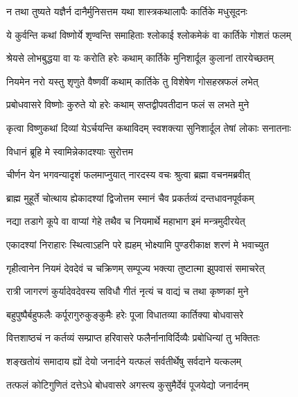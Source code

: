 \twolineshloka
{न तथा तुष्यते यज्ञैर्न दानैर्मुनिसत्तम}
{यथा शास्त्रकथालापैः कार्तिके मधुसूदनः} %

\twolineshloka
{ये कुर्वन्ति कथां विष्णोर्ये शृण्वन्ति समाहिताः}
{श्लोकाई श्लोकमेकं वा कार्तिके गोशतं फलम्} %

\twolineshloka
{श्रेयसे लोभबुद्धया वा यः करोति हरेः कथाम्}
{कार्तिके मुनिशार्दूल कुलानां तारयेच्छतम्} %

\twolineshloka
{नियमेन नरो यस्तु शृणुते वैष्णवीं कथाम्}
{कार्तिके तु विशेषेण गोसहस्रफलं लभेत्} %

\twolineshloka
{प्रबोधवासरे विष्णोः कुरुते यो हरेः कथाम्}
{सप्तद्वीपवतीदान फलं स लभते मुने} %

\twolineshloka
{कृत्वा विष्णुकथां दिव्यां येऽर्चयन्ति कथाविदम्}
{स्वशक्त्या सुनिशार्दूल तेषां लोकाः सनातनाः} %



\onelineshloka
{विधानं ब्रूहि मे स्वामिन्नेकादश्याः सुरोत्तम} %

\twolineshloka
{चीर्णन येन भगवन्यादृशं फलमाप्नुयात्}
{नारदस्य वचः श्रुत्वा ब्रह्मा वचनमब्रवीत्} %


\twolineshloka
{ब्राह्म मुहूर्ते चोत्थाय ह्येकादश्यां द्विजोत्तम}
{स्मानं चैव प्रकर्तव्यं दन्तधावनपूर्वकम्} %

\twolineshloka
{नद्या तडागे कूपे वा वाप्यां गेहे तथैव च}
{नियमार्थे महाभाग इमं मन्त्रमुदीरयेत्} %

\twolineshloka
{एकादश्यां निराहारः स्थित्वाऽहनि परे ह्यहम्}
{भोक्ष्यामि पुण्डरीकाक्ष शरणं मे भवाच्युत} %

\twolineshloka
{गृहीत्वानेन नियमं देवदेवं च चक्रिणम्}
{सम्पूज्य भक्त्या तुष्टात्मा झुपवासं समाचरेत्} %

\twolineshloka
{रात्री जागरणं कुर्यादेवदेवस्य सविधौ}
{गीतं नृत्यं च वाद्यं च तथा कृष्णकां मुने} %

\twolineshloka
{बहुपुष्पैर्बहुफलैः कर्पूरागुरुकुङ्कुमैः}
{हरेः पूजा विधातव्या कार्तिक्या बोधवासरे} %

\twolineshloka
{वित्तशाष्ठचं न कर्तव्यं सम्प्राप्त हरिवासरे}
{फलैर्नानाविर्दिव्यैः प्रबोधिन्यां तु भक्तितः} %

\twolineshloka
{शङ्खतोयं समादाय ह्यों देयो जनार्दने}
{यत्फलं सर्वतीर्थेषु सर्वदाने यत्कलम्} %

\twolineshloka
{तत्फलं कोटिगुणितं दत्तेऽधे बोधवासरे}
{अगस्त्य कुसुमैर्देवं पूजयेद्यो जनार्दनम्} %


